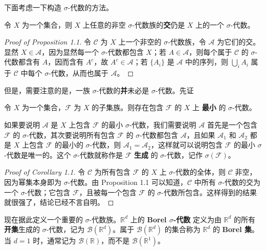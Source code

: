 \documentclass[11pt]{article}
\newcommand{\RR}{\mathbb{R}}
\newcommand{\calA}{\mathcal{A}}
\newcommand{\calB}{\mathcal{B}}
\newcommand{\calC}{\mathcal{C}}
\newcommand{\calF}{\mathcal{F}}
\begin{document}
下面考虑一下构造 $\sigma$-代数的方法。

\begin{proposition}
    令 $X$ 为一个集合，则 $X$ 上任意的非空 $\sigma$-代数族的{\normalfont\bfseries 交}仍是 $X$ 上的一个 $\sigma$-代数。
\end{proposition}

\begin{proof}[Proof of Proposition 1.1]
    令 $\calC$ 为 $X$ 上一个非空的 $\sigma$-代数族，令 $\calA$ 为它们的交。显然 $X \in \calA$，因为显然每一个 $\sigma$-代数都包含 $X$；若 $A \in \calA$，则每个属于 $\calC$ 的 $\sigma$-代数都含有 $A$，因而含有 $A^c$，故 $A^c \in \calA$；若 $\{A_i\}$ 是 $\calA$ 中的序列，则 $\bigcup_i A_i$ 属于 $\calC$ 中每个 $\sigma$-代数，从而也属于 $\calA$。
\end{proof}

但是，需要注意的是，一族 $\sigma$-代数的{\normalfont\bfseries 并}未必是 $\sigma$-代数。先证

\begin{corollary}
    令 $X$ 为一个集合，$\calF$ 为 $X$ 的子集族。则存在包含 $\calF$ 的 $X$ 上 {\normalfont\bfseries 最小} 的 $\sigma$-代数。
\end{corollary}

如果要说明 $\calA$ 是 $X$ 上包含 $\calF$ 的最小 $\sigma$-代数，我们需要说明 $\calA$ 首先是一个包含 $\calF$ 的 $\sigma$-代数，其次要说明所有包含 $\calF$ 的 $\sigma$-代数都包含 $\calA$，且如果 $\calA_1$ 和 $\calA_2$ 都是 $X$ 上包含 $\calF$ 的最小的 $\sigma$-代数，则 $\calA_1 = \calA_2$，这样就可以说明包含 $\calF$ 的最小 $\sigma$-代数是唯一的。这个 $\sigma$-代数就称作是 $\calF$ {\normalfont\bfseries 生成} 的 $\sigma$-代数，记作 $\sigma(\calF)$。

\begin{proof}[Proof of Corollary 1.1]
    令 $\calC$ 为所有包含 $\calF$ 的 $X$ 上 $\sigma$-代数的全体，则 $\calC$ 非空，因为幂集本身即为 $\sigma$-代数。由 Proposition 1.1 可以知道，$\calC$ 中所有 $\sigma$-代数的交为一个 $\sigma$-代数；它包含 $\calF$，且被每一个包含 $\calF$ 的 $\sigma$-代数所包含。这样得到的结果就很强了，结论已经不言自明。
\end{proof}

现在据此定义一个重要的 $\sigma$-代数族。$\RR^d$ 上的 {\normalfont\bfseries Borel $\sigma$-代数} 定义为由 $\RR^d$ 的所有{\normalfont\bfseries 开集}生成的 $\sigma$-代数，记为 $\calB(\RR^d)$。属于 $\calB(\RR^d)$ 的集合称为 $\RR^d$ 的 {\normalfont\bfseries Borel 集}。当 $d=1$ 时，通常记为 $\calB(\RR)$，而不是 $\calB(\RR^1)$。
\end{document}
